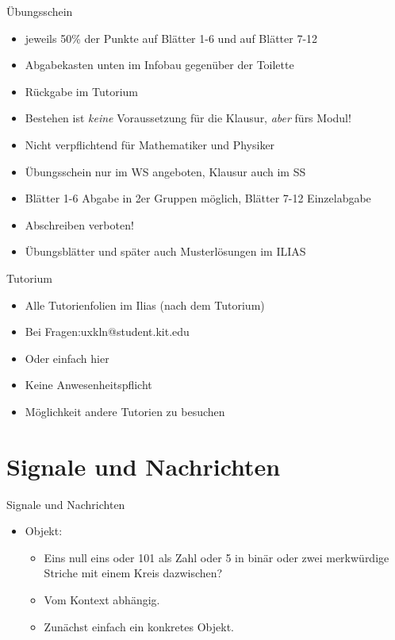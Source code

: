 \documentclass{beamer}
\begin{document}
\begin{frame}{Übungsschein}
	\begin{itemize}
		 
		\item jeweils 50\% der Punkte auf Blätter 1-6 und auf Blätter 7-12
		\item Abgabekasten unten im Infobau gegenüber der Toilette
		\item Rückgabe im Tutorium 
		\item Bestehen ist \emph{keine} Voraussetzung für die Klausur, \emph{aber} fürs Modul! 
		\item Nicht verpflichtend für Mathematiker und Physiker
		\item Übungsschein nur im WS angeboten, Klausur auch im SS
		\item Blätter 1-6 Abgabe in 2er Gruppen möglich, Blätter 7-12 Einzelabgabe
		\item Abschreiben verboten!
		\item Übungsblätter und später auch Musterlösungen im ILIAS
	\end{itemize}
\end{frame}

\begin{frame}{Tutorium}
	\begin{itemize}
		\item Alle Tutorienfolien im Ilias (nach dem Tutorium)
	\end{itemize}
	 
	
	\begin{itemize}
		\item Bei Fragen:uxkln@student.kit.edu 
		\item Oder einfach hier
		\item Keine Anwesenheitspflicht 
		\item Möglichkeit andere Tutorien zu besuchen
	\end{itemize}
\end{frame}


\section{Signale und Nachrichten}

\begin{frame}{Signale und Nachrichten}
	\begin{itemize}
		 \item Objekt: 
		\begin{itemize}
			 \item Eins null eins oder 101 als Zahl oder 5 in binär oder zwei merkwürdige Striche mit einem Kreis dazwischen?
			 \item Vom Kontext abhängig.
			 \item Zunächst einfach ein konkretes Objekt.
		\end{itemize}
	\end{itemize}
\end{frame}
\end{document}
